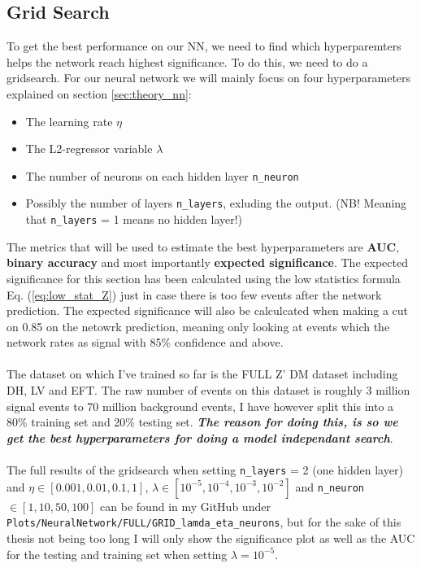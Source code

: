 \documentclass[14pt, a4paper]{book}
\begin{document}
\subsection{Grid Search}\label{sec:NNGriddy}
To get the best performance on our NN, we need to find which hyperparemters helps the network reach highest significance. To do this, we need to do a gridsearch. 
For our neural network we will mainly focus on four hyperparameters explained on section \ref{sec:theory_nn}:
\begin{itemize}
   \item The learning rate $\eta$
   \item The L2-regressor variable $\lambda$
   \item The number of neurons on each hidden layer \verb|n_neuron|
   \item Possibly the number of layers \verb|n_layers|, exluding the output. (NB! Meaning that \verb|n_layers| = 1 means no hidden layer!)
\end{itemize}
The metrics that will be used to estimate the best hyperparameters are \textbf{AUC}, \textbf{binary accuracy} and most importantly \textbf{expected significance}. 
The expected significance for this section has been calculated using the low statistics formula Eq. (\ref{eq:low_stat_Z}) just in case there is too few events after the network prediction.
The expected significance will also be calculcated when making a cut on 0.85 on the netowrk prediction, meaning only looking at events which the network rates as signal with 85\% confidence and above.\\
\\The dataset on which I've trained so far is the FULL Z' DM dataset including DH, LV and EFT. The raw number of events on this dataset is roughly 3 million signal events to 70 million background events,
I have however split this into a 80\% training set and 20\% testing set. \textit{\textbf{The reason for doing this, is so we get the best hyperparameters for doing a model independant search}}.\\
\\The full results of the gridsearch when setting \verb|n_layers| = 2 (one hidden layer) and $\eta \in [0.001, 0.01, 0.1, 1]$, $\lambda\in[10^{-5},10^{-4},10^{-3},10^{-2}]$ and \verb|n_neuron|$\in[1, 10, 50, 100]$ can be found in my GitHub under \\\verb|Plots/NeuralNetwork/FULL/GRID_lamda_eta_neurons|, 
but for the sake of this thesis not being too long I will only show the significance plot as well as the AUC for the testing and training set when setting $\lambda=10^{-5}$. 
\end{document}
